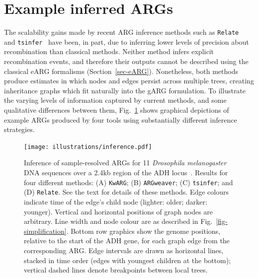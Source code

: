 \documentclass{article}
\newcommand{\tsinfer}[0]{\texttt{tsinfer}}
\newcommand{\kwarg}[0]{\texttt{KwARG}}
\newcommand{\argweaver}[0]{\texttt{ARGweaver}}
\newcommand{\relate}[0]{\texttt{Relate}}
\begin{document}
\section{Example inferred ARGs}
\label{sec-example-inferred-args}
The scalability gains made by recent ARG inference methods
such as \relate~\citep{speidel2019method} and
\tsinfer~\citep{kelleher2019inferring}
have been, in part, due to inferring lower levels of precision about
recombination than classical methods.
Neither method infers
explicit recombination events, and therefore their outputs cannot
be described using the classical eARG formalisms (Section~\ref{sec-eARG}).
Nonetheless, both methods produce estimates in which nodes and edges
persist across multiple trees, creating
inheritance graphs which fit naturally into the gARG formulation.
To illustrate the varying levels of information captured
by current methods, and some qualitative differences between them,
Fig.~\ref{fig-inferred-args} shows graphical depictions of
example ARGs produced by four tools using substantially
different inference strategies.

\begin{figure} \begin{center}
\texttt{[image: illustrations/inference.pdf]} \end{center}
\caption{\label{fig-inferred-args} Inference of sample-resolved ARGs for 11
\textit{Drosophila melanogaster} DNA sequences over a 2.4kb
region of the ADH locus~\citep{kreitman1983nucleotide}.
Results for four different methods:
(A) \kwarg; (B) \argweaver; (C) \tsinfer; and (D) \relate. See the
text for details of these methods.
Edge colours indicate time of the edge's child node
(lighter: older; darker: younger).
Vertical and horizontal positions of graph nodes are arbitrary.
Line width and node colour are as described in Fig.~\ref{fig-simplification}.
Bottom row graphics show the genome positions, relative to the start of
the ADH gene, for each graph edge from the corresponding ARG. Edge intervals
are drawn as horizontal lines, stacked in time order (edges with youngest
children at the bottom); vertical dashed lines denote breakpoints between
local trees.
}
\end{figure}
\end{document}
